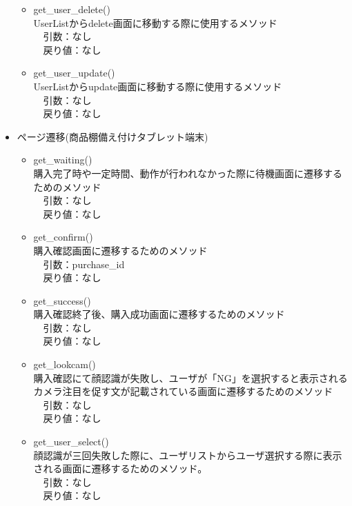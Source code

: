 \documentclass[a4, dvipdfmx, uplatex]{jsarticle}
\begin{document}
\begin{itemize}
\begin{itemize}
\item get\_user\_delete() \\
UserListからdelete画面に移動する際に使用するメソッド \\
　引数：なし \\
　戻り値：なし \\

\item get\_user\_update() \\
UserListからupdate画面に移動する際に使用するメソッド \\
　引数：なし \\
　戻り値：なし \\
\end{itemize}

\item ページ遷移(商品棚備え付けタブレット端末)

\begin{itemize}
\item get\_waiting() \\
購入完了時や一定時間、動作が行われなかった際に待機画面に遷移するためのメソッド \\
　引数：なし \\
　戻り値：なし \\

\item get\_confirm() \\
購入確認画面に遷移するためのメソッド \\
　引数：purchase\_id \\
　戻り値：なし \\

\item get\_success() \\
購入確認終了後、購入成功画面に遷移するためのメソッド　\\
　引数：なし \\
　戻り値：なし \\

\item get\_lookcam() \\
購入確認にて顔認識が失敗し、ユーザが「NG」を選択すると表示されるカメラ注目を促す文が記載されている画面に遷移するためのメソッド \\
　引数：なし \\
　戻り値：なし \\

\item get\_user\_select() \\
顔認識が三回失敗した際に、ユーザリストからユーザ選択する際に表示される画面に遷移するためのメソッド。　\\
　引数：なし \\
　戻り値：なし \\
\end{itemize}


\end{itemize}
\end{document}
